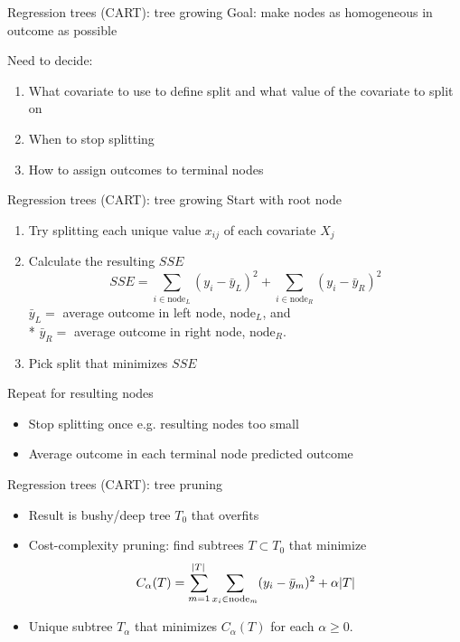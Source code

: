 \documentclass[handout]{beamer}
\begin{document}
\begin{frame}{Regression trees (CART): tree growing}
  Goal: make nodes as homogeneous in outcome as possible
  
  \pause
  Need to decide:
  \begin{enumerate}[<+->]
    \item What covariate to use to define split and what value of the covariate to split on
    \item When to stop splitting
    \item How to assign outcomes to terminal nodes
  \end{enumerate}
\end{frame}

\begin{frame}{Regression trees (CART): tree growing}
  Start with root node
  
  \begin{enumerate}[<+(1)->]
  \item Try splitting each unique value $x_{ij}$ of each covariate $X_{j}$
  \item Calculate the resulting $SSE$
  \begin{equation*}
    SSE = \sum_{i \in \text{node}_{L}} (y_{i} - \bar{y}_{L})^2 + \sum_{i \in \text{node}_{R}} (y_{i} - \bar{y}_{R})^2
  \end{equation*}
  $\bar{y}_{L} = $ average outcome in left node, $\text{node}_{L}$, and \\*   $\bar{y}_{R} = $ average outcome in right node, $\text{node}_{R}$.
  \item Pick split that minimizes $SSE$
    \end{enumerate}
  \pause
  Repeat for resulting nodes 
    
  \begin{itemize}[<+(1)->]
  \item Stop splitting once e.g. resulting nodes too small
  \item Average outcome in each terminal node predicted outcome 
  \end{itemize}
\end{frame}

\begin{frame}[c]{Regression trees (CART): tree pruning}
  \begin{itemize}[<+->]
    \item Result is bushy/deep tree $T_{0}$ that overfits
    \item Cost-complexity pruning: find subtrees $T \subset T_{0}$ that minimize
    \begin{equation*}
        C_{\alpha}(T) = \sum_{m = 1}^{\abs{T}} \sum_{x_{i} \in \text{node}_{m}} (y_{i} - \bar{y}_{m})^2 + \alpha \abs{T}
    \end{equation*}
    \item Unique subtree $T_{\alpha}$ that minimizes $C_{\alpha}(T)$ for each $\alpha \geq 0$.
  \end{itemize}
\end{frame}
\end{document}
